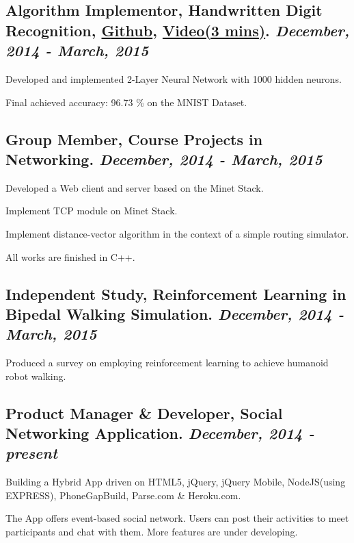 \documentclass[letterpaper,8pt]{extarticle}
\newlength{\wideitemsep}
\let\olditem\item
\renewcommand{\item}{\setlength{\itemsep}{\wideitemsep}\olditem}
\renewenvironment{itemize}{
  \begin{list}{}{
    \setlength{\leftmargin}{1.5em}
  }
}{
  \end{list}
}
\begin{document}
\subsection*{\textbf{Algorithm Implementor}, Handwritten Digit Recognition, \href{https://github.com/Yaliang/Handwritten}{\color[rgb]{0.2, 0.7, 0.7} Github}, \href{https://drive.google.com/file/d/0B0flKXz1pWAcb2RIVU5SbUd0dkU/view}{\color[rgb]{0.2, 0.7, 0.7} Video(3 mins)}. \hfill {\it December, 2014 - March, 2015}}
\begin{itemize}
	\item[$\circ$] Developed and implemented 2-Layer Neural Network with 1000 hidden neurons.
	\item[$\circ$] Final achieved accuracy: 96.73 \% on the MNIST Dataset.  \hspace{0.2in} 
\end{itemize}

\subsection*{\textbf{Group Member}, Course Projects in Networking. \hfill {\it December, 2014 - March, 2015}}
\begin{itemize}
	\item[$\circ$] Developed a Web client and server based on the Minet Stack.
	\item[$\circ$] Implement TCP module on Minet Stack. 
	\item[$\circ$] Implement distance-vector algorithm in the context of a simple routing simulator.
	\item[$\circ$] All works are finished in C++.
\end{itemize}

\subsection*{\textbf{Independent Study}, Reinforcement Learning in Bipedal Walking Simulation. \hfill {\it December, 2014 - March, 2015}}
\begin{itemize}
	\item[$\circ$] Produced a survey on employing reinforcement learning to achieve humanoid robot walking.
\end{itemize}

\subsection*{\textbf{Product Manager \& Developer}, Social Networking Application. \hfill {\it December, 2014 - present}}
\begin{itemize}
	\item[$\circ$] Building a Hybrid App driven on HTML5, jQuery, jQuery Mobile, NodeJS(using EXPRESS), PhoneGap\texttrademark Build, Parse.com \& Heroku.com.
	\item[$\circ$] The App offers event-based social network. Users can post their activities to meet participants and chat with them. More features are under developing.
	
\end{itemize}
\end{document}
